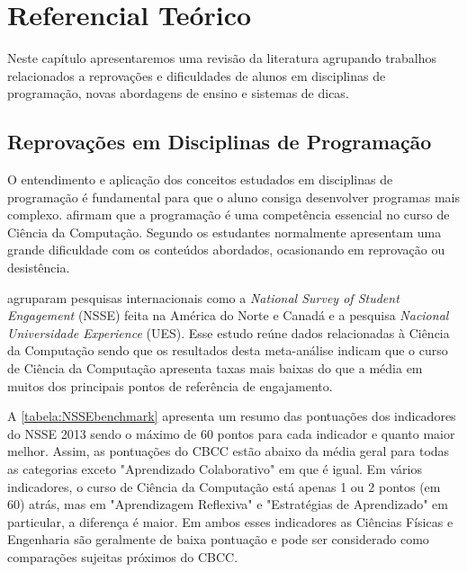 \chapter{Referencial Teórico}
Neste capítulo apresentaremos uma revisão da literatura agrupando trabalhos relacionados a reprovações e dificuldades de alunos em disciplinas de programação, novas abordagens de ensino e sistemas de dicas. 

\section{Reprovações em Disciplinas de Programação}

O entendimento e aplicação dos conceitos estudados em disciplinas de programação é fundamental para que o aluno consiga desenvolver programas mais complexo.  afirmam que a programação é uma competência essencial no curso de Ciência da Computação. Segundo  os estudantes normalmente apresentam uma grande dificuldade com os conteúdos abordados, ocasionando em reprovação ou desistência.

 agruparam pesquisas internacionais como a \textit{National Survey of Student Engagement} (NSSE) feita na América do Norte e Canadá e a pesquisa \textit{Nacional Universidade Experience} (UES). Esse estudo reúne dados relacionadas à Ciência da Computação sendo que os resultados desta meta-análise indicam que o curso de Ciência da Computação apresenta taxas mais baixas do que a média em muitos dos principais pontos de referência de engajamento. 

A \cref{tabela:NSSEbenchmark} apresenta um resumo das pontuações dos indicadores do NSSE 2013 sendo o máximo de 60 pontos para cada indicador e quanto maior melhor. Assim, as pontuações do CBCC estão abaixo da média geral para todas as categorias exceto "Aprendizado Colaborativo" em que é igual. Em vários indicadores, o curso de Ciência da Computação está apenas 1 ou 2 pontos (em 60) atrás, mas em "Aprendizagem Reflexiva" e "Estratégias de Aprendizado" em particular, a diferença é maior. Em ambos esses indicadores as Ciências Físicas e Engenharia são geralmente de baixa pontuação e pode ser considerado como comparações sujeitas próximos do CBCC. 

